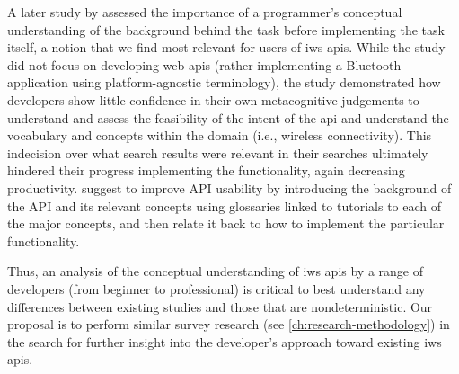 A later study by \citet{Ko:2011fb} assessed the importance of a programmer's conceptual understanding of the background behind the task before implementing the task itself, a notion that we find most relevant for users of \gls{iws} \glspl{api}. While the study did not focus on developing web \glspl{api} (rather implementing a Bluetooth application using platform-agnostic terminology), the study demonstrated how developers show little confidence in their own metacognitive judgements to understand and assess the feasibility of the intent of the \gls{api} and understand the vocabulary and concepts within the domain (i.e., wireless connectivity). This indecision over what search results were relevant in their searches ultimately hindered their progress implementing the functionality, again decreasing productivity. \citeauthor{Ko:2011fb} suggest to improve API usability by introducing the background of the API and its relevant concepts using glossaries linked to tutorials to each of the major concepts, and then relate it back to how to implement the particular functionality.

Thus, an analysis of the conceptual understanding of \gls{iws} \glspl{api} by a range of developers (from beginner to professional) is critical to best understand any differences between existing studies and those that are nondeterministic. Our proposal is to perform similar survey research (see \cref{ch:research-methodology}) in the search for further insight into the developer's approach toward existing \gls{iws} \glspl{api}.
